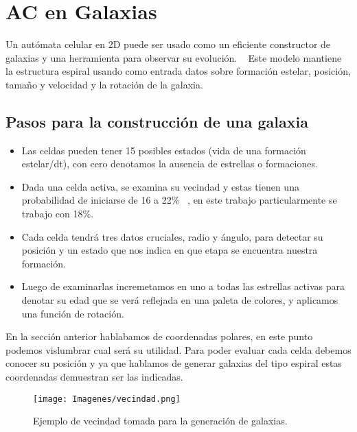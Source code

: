 \documentclass[12tp]{article}
\begin{document}
\begin{center}
\end{center}

\section{AC en Galaxias}
Un autómata celular en 2D puede ser usado como un eficiente constructor de galaxias y una herramienta para observar su evolución. 
~\cite{kent}
Este modelo mantiene la estructura espiral usando como entrada datos sobre formación estelar, posición, tamaño y velocidad y 
la rotación de la galaxia.~\cite{kent}
\subsection{Pasos para la construcción de una galaxia}
\begin{itemize}
    \item Las celdas pueden tener 15 posibles estados (vida de una formación estelar/dt), con cero denotamos la 
    ausencia de estrellas o formaciones.
    \item Dada una celda activa, se examina su vecindad y estas tienen una probabilidad de iniciarse de 16 a 22\% ~\cite{kent}, en este
    trabajo particularmente se trabajo con 18\%.
    \item Cada celda tendrá tres datos cruciales, radio y ángulo, para detectar su posición y un estado que nos indica en que
    etapa se encuentra nuestra formación.
    \item Luego de examinarlas incremetamos en uno a todas las estrellas activas para denotar su edad que se verá reflejada en
    una paleta de colores, y aplicamos una función de rotación.  
\end{itemize}
En la sección anterior hablabamos de coordenadas polares, en este punto podemos vislumbrar cual será su utilidad.
Para poder evaluar cada celda debemos conocer su posición y ya que hablamos de generar galaxias del tipo espiral estas coordenadas
demuestran ser las indicadas.
    \begin{figure}
        \begin{center}
            \texttt{[image: Imagenes/vecindad.png]}
        \caption{Ejemplo de vecindad tomada para la generación de galaxias.}
         \label{fig:vecindad}
    \end{center}
    \end{figure}
\end{document}
